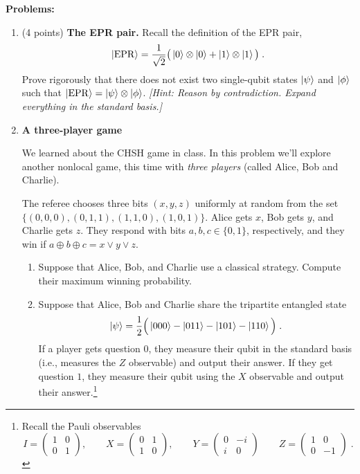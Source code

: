 \documentclass[12pt]{article}
\begin{document}
 
\medskip
{\bf Problems:}
\begin{enumerate}

\item (4 points) {\bf The EPR pair.}
Recall the definition of the EPR pair,
\[ \ket{\mathrm{EPR}} = \frac{1}{\sqrt{2}} \big( \ket{0} \otimes \ket{0} + \ket{1}\otimes \ket{1}\big)\;.\]
Prove rigorously that there does not exist two single-qubit states $\ket{\psi}$ and $\ket{\phi}$ such that $\ket{\mathrm{EPR}} = \ket{\psi} \otimes \ket{\phi}$. \emph{[Hint: Reason by contradiction. Expand everything in the standard basis.]}


\item {\bf A three-player game}

We learned about the CHSH game in class. In this problem we'll explore another nonlocal game, this time with \emph{three players} (called Alice, Bob and Charlie).

The referee chooses three bits $(x,y,z)$ uniformly at random from the set $\{ (0,0,0), (0,1,1), (1,1,0), (1,0,1) \}$. Alice gets $x$, Bob gets $y$, and Charlie gets $z$. They respond with bits $a,b,c \in \{0,1\}$, respectively, and they win if $a \oplus b \oplus c = x \vee y \vee z$. 
\begin{enumerate}
\item Suppose that Alice, Bob, and Charlie use a classical strategy. Compute their maximum winning probability.
\item Suppose that Alice, Bob and Charlie share the tripartite entangled state 
\[
    \ket{\psi} = \frac{1}{2} \Big( \ket{000} - \ket{011} - \ket{101} - \ket{110} \Big) \;.
\]
If a player gets question $0$, they measure their qubit in the standard basis (i.e., measures the $Z$ observable) and output their answer. If they get question $1$, they measure their qubit using the $X$ observable and output their answer.\footnote{Recall the Pauli observables
\[
     I = \begin{pmatrix} 1 & 0 \\ 0 & 1 \end{pmatrix}, \qquad X = \begin{pmatrix} 0 & 1 \\ 1 & 0 \end{pmatrix}, \qquad Y = \begin{pmatrix} 0 & -i \\ i & 0 \end{pmatrix} \qquad Z = \begin{pmatrix} 1 & 0 \\ 0 & -1 \end{pmatrix}\;.
\]
}


\end{enumerate}
\end{enumerate}
\end{document}
